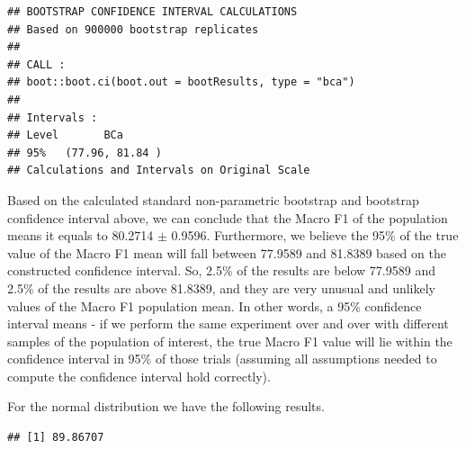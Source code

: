 \documentclass[
]{article}
\newenvironment{Shaded}{\begin{snugshade}}{\end{snugshade}}
\newcommand{\CommentTok}[1]{\textcolor[rgb]{0.56,0.35,0.01}{\textit{#1}}}
\newcommand{\DecValTok}[1]{\textcolor[rgb]{0.00,0.00,0.81}{#1}}
\newcommand{\FunctionTok}[1]{\textcolor[rgb]{0.00,0.00,0.00}{#1}}
\newcommand{\NormalTok}[1]{#1}
\newcommand{\OtherTok}[1]{\textcolor[rgb]{0.56,0.35,0.01}{#1}}
\newcommand{\SpecialCharTok}[1]{\textcolor[rgb]{0.00,0.00,0.00}{#1}}
\newcommand{\StringTok}[1]{\textcolor[rgb]{0.31,0.60,0.02}{#1}}
\begin{document}
\begin{verbatim}
## BOOTSTRAP CONFIDENCE INTERVAL CALCULATIONS
## Based on 900000 bootstrap replicates
## 
## CALL : 
## boot::boot.ci(boot.out = bootResults, type = "bca")
## 
## Intervals : 
## Level       BCa          
## 95%   (77.96, 81.84 )  
## Calculations and Intervals on Original Scale
\end{verbatim}

Based on the calculated standard non-parametric bootstrap and bootstrap confidence interval above, we can conclude that the Macro F1 of the population means it equals to 80.2714 \(\pm\) 0.9596. Furthermore, we believe the 95\% of the true value of the Macro F1 mean will fall between 77.9589 and 81.8389 based on the constructed confidence interval. So, 2.5\% of the results are below 77.9589 and 2.5\% of the results are above 81.8389, and they are very unusual and unlikely values of the Macro F1 population mean. In other words, a 95\% confidence interval means - if we perform the same experiment over and over with different samples of the population of interest, the true Macro F1 value will lie within the confidence interval in 95\% of those trials (assuming all assumptions needed to compute the confidence interval hold correctly).

For the normal distribution we have the following results.

\begin{Shaded}
\end{Shaded}

\begin{verbatim}
## [1] 89.86707
\end{verbatim}
\end{document}
